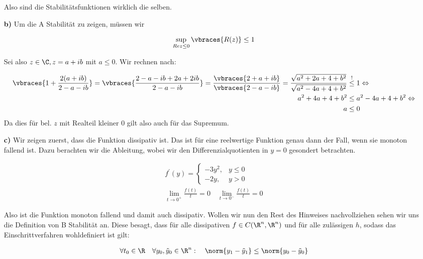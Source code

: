 \begin{solution}
\begin{itemize}
    Also sind die Stabilitätsfunktionen wirklich die selben.

  \item[\textbf{b)}] Um die A Stabilität zu zeigen, müssen wir

    \begin{align*}
      \sup\limits_{Re z \leq 0} \vbraces{R(z)} \leq 1
    \end{align*}

    Sei also $z \in \C, z=a+ ib$ mit $a \leq 0$. Wir rechnen nach:

    \begin{align*}
      \vbraces{1+\frac{2(a+ib)}{2-a-ib}} = \vbraces{\frac{2-a-ib +2a +2ib}{2-a-ib}}
      = \frac{\vbraces{2+a+ib}}{\vbraces{2-a-ib}}
      = \frac{\sqrt{a^2 +2a +4 +b^2}}{\sqrt{a^2-4a+4+b^2}} &\stackrel{!}{\leq} 1
      \Leftrightarrow \\
      a^2 + 4a +4 +b^2 &\leq a^2 -4a +4+b^2 \Leftrightarrow \\
      a &\leq 0
    \end{align*}
    Da dies für bel. $z$ mit Realteil kleiner 0 gilt also auch für das Supremum.

  \item[\textbf{c)}] Wir zeigen zuerst, dass die Funktion dissipativ ist. Das ist für
    eine reelwertige Funktion genau dann der Fall, wenn sie monoton fallend ist. Dazu
    berachten wir die Ableitung, wobei wir den Differenzialquotienten in $y=0$  gesondert betrachten.

    \begin{align*}
      f^\prime (y) = \begin{cases}
      -3 y^2 , & y \leq 0 \\
      -2 y, & y > 0
    \end{cases} \\
    \lim\limits_{t \rightarrow 0^+} \frac{f(t)}{t} = 0 \quad
    \lim\limits_{t \rightarrow 0^-} \frac{f(t)}{t} = 0
    \end{align*}

    Also ist die Funktion monoton fallend und damit auch dissipativ. Wollen wir nun
    den Rest des Hinweises nachvollziehen sehen wir uns die Definition von B Stabilität
    an. Diese besagt, dass für alle dissipativen $f \in C(\R^n ,\R^n )$ und für alle
    zulässigen $h$, sodass das Einschrittverfahren wohldefiniert ist gilt:

    \begin{align*}
      \forall t_0 \in \R \quad \forall y_0 , \tilde{y}_0 \in \R^n : \quad
      \norm{y_1 - \tilde{y}_1} \leq \norm{y_0 - \tilde{y}_0}
    \end{align*}


\end{itemize}
\end{solution}
